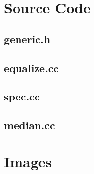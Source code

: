 \section{Source Code}
  \subsection{generic.h}
    
  \subsection{equalize.cc}
    
  \subsection{spec.cc}
    
  \subsection{median.cc}
    
\section{Images}
  
